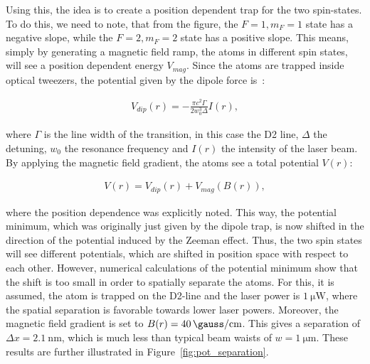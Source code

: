 
Using this, the idea is to create a position dependent trap for the two spin-states. To do this, we need to note, that from the figure, the $F=1, m_F=1$ state has a negative slope, while the $F=2, m_F=2$ state has a positive slope. This means, simply by generating a magnetic field ramp, the atoms in different spin states, will see a position dependent energy $V_{mag}$. Since the atoms are trapped inside optical tweezers, the potential given by the dipole force is~\cite{LeKien2013}:

\begin{align}
	V_{dip}(r) = -\frac{\pi c^2 \Gamma}{2 w_0^3 \Delta} I(r),
\end{align}

where $\Gamma$ is the line width of the transition, in this case the D2 line, $\Delta$ the detuning, $w_0$ the resonance frequency and $I(r)$ the intensity of the laser beam. By applying the magnetic field gradient, the atoms see a total potential $V(r)$:

\begin{align}
	V(r) = V_{dip}(r) + V_{mag}(B(r)),
\end{align}

where the position dependence was explicitly noted. This way, the potential minimum, which was originally just given by the dipole trap, is now shifted in the direction of the potential induced by the Zeeman effect. Thus, the two spin states will see different potentials, which are shifted in position space with respect to each other. However, numerical calculations of the potential minimum show that the shift is too small in order to spatially separate the atoms. For this, it is assumed, the atom is trapped on the D2-line and the laser power is $\SI{1}{\micro\watt}$, where the spatial separation is favorable towards lower laser powers. Moreover, the magnetic field gradient is set to $B(r) = \SI{40}{\gauss\per\centi\meter}$. This gives a separation of $\Delta x = \SI{2.1}{\nano\meter}$, which is much less than typical beam waists of $w = \SI{1}{\micro\meter}$.
These results are further illustrated in Figure~\ref{fig:pot_separation}.

